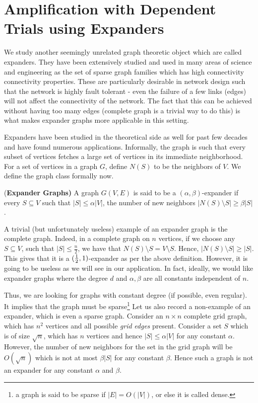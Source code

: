\section{Amplification with Dependent Trials using Expanders}
\label{sec:intro-expanders}

We study another seemingly unrelated graph theoretic object which are called expanders. They have been extensively studied and used in many areas of science and engineering as the set of sparse graph families which has high connectivity connectivity properties. These are particularly desirable in network design such that the network is highly fault tolerant - even the failure of a few links (edges) will not affect the connectivity of the network. The fact that this can be achieved without having too many edges (complete graph is a trivial way to do this) is what makes expander graphs more applicable in this setting.

Expanders have been studied in the theoretical side as well for past few decades and have found numerous applications. Informally, the graph is such that every subset of vertices fetches a large set of vertices in its immediate neighborhood. For a set of vertices in a graph $G$, define $N(S)$ to be the neighbors of $V$. We define the graph class formally now.

\begin{definition}{(\bf Expander Graphs)}
A graph $G(V,E)$ is said to be a $(\alpha,\beta)$-expander if every $S \subseteq V$ such that $|S| \le \alpha|V|$, the number of new neighbors $|N(S)\setminus S| \ge \beta|S|$.
\end{definition}

A trivial (but unfortunately useless) example of an expander graph is the complete graph. Indeed, in a complete graph on $n$ vertices, if we choose any $S \subseteq V$, such that $|S| \le \frac{n}{2}$, we have that $N(S)\setminus S = V \setminus S$. Hence, $|N(S)\setminus S| \ge |S|$. This gives that it is a $(\frac{1}{2},1)$-expander as per the above definition. However, it is going to be useless as we will see in our application. In fact, ideally, we would like expander graphs where the degree $d$ and $\alpha, \beta$ are all constants independent of $n$.

Thus, we are looking for graphs with constant degree (if possible, even regular). It implies that the graph must be sparse\footnote{a graph is said to be sparse if $|E| = O(|V|)$, or else it is called dense.}
Let us also record a non-example of an expander, which is even a sparse graph. Consider an $n \times n$ complete grid graph, which has $n^2$ vertices and all possible {\em grid edges} present. Consider a set $S$ which is of size $\sqrt{n}$, which has $n$ vertices and hence $|S| \le \alpha |V|$ for any constant $\alpha$. However, the number of new neighbors for the set in the grid graph will be $O(\sqrt{n})$ which is not at most $\beta|S|$ for any constant $\beta$. Hence such a graph is not an expander for any constant $\alpha$ and $\beta$.

